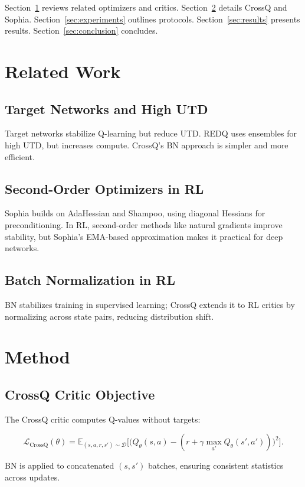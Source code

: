 \documentclass[11pt,a4paper]{article}
\begin{document}
Section~\ref{sec:related} reviews related optimizers and critics. Section~\ref{sec:method} details CrossQ and Sophia. Section~\ref{sec:experiments} outlines protocols. Section~\ref{sec:results} presents results. Section~\ref{sec:conclusion} concludes.

\section{Related Work}
\label{sec:related}

\subsection{Target Networks and High UTD}
Target networks stabilize Q-learning but reduce UTD. REDQ uses ensembles for high UTD, but increases compute. CrossQ's BN approach is simpler and more efficient.

\subsection{Second-Order Optimizers in RL}
Sophia builds on AdaHessian and Shampoo, using diagonal Hessians for preconditioning. In RL, second-order methods like natural gradients improve stability, but Sophia's EMA-based approximation makes it practical for deep networks.

\subsection{Batch Normalization in RL}
BN stabilizes training in supervised learning; CrossQ extends it to RL critics by normalizing across state pairs, reducing distribution shift.

\section{Method}
\label{sec:method}

\subsection{CrossQ Critic Objective}
\label{subsec:crossq}

The CrossQ critic computes Q-values without targets:

\[
\mathcal{L}_{\text{CrossQ}}(\theta) = \mathbb{E}_{(s,a,r,s')\sim\mathcal{D}}\Big[\big(Q_\theta(s,a) - (r + \gamma \max_{a'} Q_\theta(s',a'))\big)^2\Big].
\]

BN is applied to concatenated $(s, s')$ batches, ensuring consistent statistics across updates.
\end{document}
